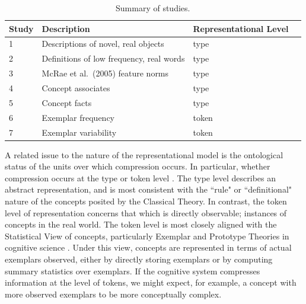 \begin{table}[t]
\footnotesize
\centering
\begin{tabular}{l l l l  }
 \toprule
 \textbf{Study} &  \textbf{Description} & \textbf{Representational Level}  \\
 \toprule

1  & Descriptions of novel, real objects & type   \\
2  & Definitions of low frequency, real words & type \\
3  & McRae et al.\ (2005) feature norms & type  \\
4  & Concept associates & type    \\
5  & Concept facts & type  \\
6  & Exemplar frequency& token   \\
7  & Exemplar variability & token  \\
 \bottomrule
\end{tabular}
\caption{Summary of studies.}
\label{tab:complexity_pred_summary_table}
\end{table}



 
A related issue to the nature of the representational model is the ontological status of the units over which compression occurs. In particular, whether compression occurs at the type or token level \cite{peirce}. The type level describes an abstract representation, and is most consistent with the ``rule" or ``definitional" nature of the concepts posited by the Classical Theory. In contrast, the token level of representation concerns that which is directly observable; instances of concepts in the real world.  The token level is most closely aligned with the Statistical View of concepts, particularly Exemplar and Prototype Theories in cognitive science  \cite{laurence1999concepts}. Under this view, concepts are represented in terms of actual exemplars observed, either by directly storing exemplars or by computing summary statistics over exemplars. If the cognitive system compresses information at the level of tokens, we might expect, for example, a concept with more observed exemplars to be more conceptually complex. 

